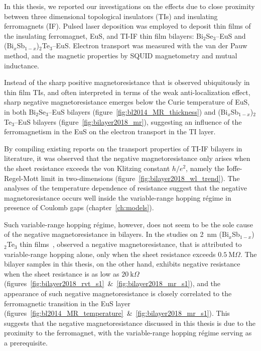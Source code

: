In this thesis, we reported our investigations on the effects due to close proximity between three dimensional topological insulators (TIs) and insulating ferromagnets (IF). Pulsed laser deposition was employed to deposit thin films of the insulating ferromagnet, EuS, and TI-IF thin film bilayers: Bi$_2$Se$_3$--EuS and (Bi$_x$Sb$_{1-x}$)$_2$Te$_3$--EuS. Electron transport was measured with the van der Pauw method, and the magnetic properties by SQUID magnetometry and mutual inductance.

Instead of the sharp positive magnetoresistance that is observed ubiquitously in thin film TIs, and often interpreted in terms of the weak anti-localization effect, sharp negative magnetoresistance emerges below the Curie temperature of EuS, in both Bi$_2$Se$_3$--EuS bilayers (figure~\ref{fig:bl2014_MR_thickness}) and (Bi$_x$Sb$_{1-x}$)$_2$Te$_3$--EuS bilayers (figure~\ref{fig:bilayer2018_mr}), suggesting an influence of the ferromagnetism in the EuS on the electron transport in the TI layer.

By compiling existing reports on the transport properties of TI-IF bilayers in literature, it was observed that the negative magnetoresistance only arises when the sheet resistance exceeds the von Klitzing constant $h / e^2$, namely the Ioffe-Regel-Mott limit in two-dimensions (figure~\ref{fig:bilayer2018_wl_trend}). The analyses of the temperature dependence of resistance suggest that the negative magnetoresistance occurs well inside the variable-range hopping r\'egime in presence of Coulomb gaps (chapter~\ref{ch:models}).

Such variable-range hopping r\'egime, however, does not seem to be the sole cause of the negative magnetoresistance in bilayers. In the studies on \SI{2}{nm} (Bi$_x$Sb$_{1-x}$)$_2$Te$_3$ thin films~\cite{liao2015}, \citeauthor{liao2015} observed a negative magnetoresistance, that is attributed to variable-range hopping alone, only when the sheet resistance exceeds $0.5~\textrm{M}\Omega$. The bilayer samples in this thesis, on the other hand, exhibits negative resistance when the sheet resistance is as low as $20~\textrm{k}\Omega$ (figures~\ref{fig:bilayer2018_rvt_s1}~\&~\ref{fig:bilayer2018_mr_s1}), and the appearance of such negative magnetoresistance is closely correlated to the ferromagnetic transition in the EuS layer (figures~\ref{fig:bl2014_MR_temperature}~\&~\ref{fig:bilayer2018_mr_s1}). This suggests that the negative magnetoresistance discussed in this thesis is due to the proximity to the ferromagnet, with the variable-range hopping r\'egime serving as a prerequisite.

